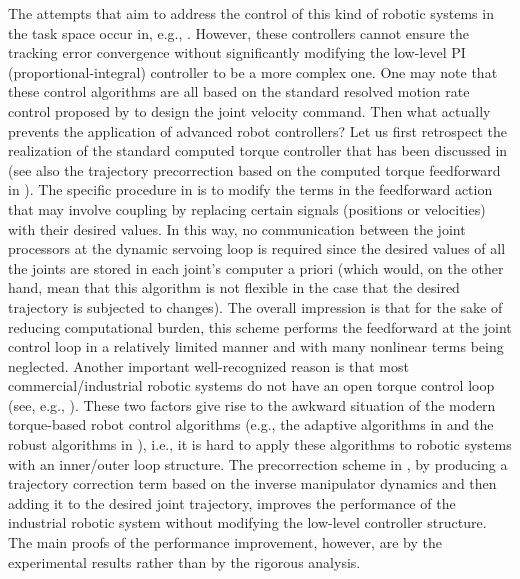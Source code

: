 \documentclass[9pt,technote]{IEEEtran}
\begin{document}
The attempts that aim to address the control of this kind of robotic systems in the task space occur in, e.g., \cite{Aicardi1995_ICRA,Roy2002_TRA,Kelly2005_AUT,Camarillo2008_Robotica}. However, these controllers cannot ensure the tracking error convergence without significantly modifying the low-level PI (proportional-integral) controller to be a more complex one. One may note that these control algorithms are all based on the standard resolved motion rate control proposed by \cite{Whitney1969_Resolved} to design the joint velocity command. Then what actually prevents the application of advanced robot controllers? Let us first retrospect the realization of the standard computed torque controller that has been discussed in \cite[p.~209, p.~210]{Spong1989_Book} (see also the trajectory precorrection based on the computed torque feedforward in \cite{Grotjahn2002_IJRR}). The specific procedure in \cite{Spong1989_Book}  is to modify the terms in the feedforward action that may involve coupling by replacing certain signals (positions or velocities) with their desired values. In this way, no communication between the joint processors at the dynamic servoing loop is required since the desired values of all the joints are stored in each joint's computer a priori (which would, on the other hand, mean that this algorithm is not flexible in the case that the desired trajectory is subjected to changes). The overall impression is that for the sake of reducing computational burden, this scheme performs the feedforward at the joint control loop in a relatively limited manner and with many nonlinear terms being neglected. Another important well-recognized reason is that most commercial/industrial robotic systems do not have an open torque control loop (see, e.g., \cite{Sanfilippo2015_RAM}). These two factors give rise to the awkward situation of the modern torque-based robot control algorithms (e.g., the adaptive algorithms in \cite{Slotine1987_IJRR,Spong1989_SCL,Cheah2006_TAC,Liu2006_TRO,Dixon2007_TAC,Wang2015_AUT,Wang2012a_MECH} and the robust algorithms in \cite{Spong1992_TAC,Yao1996_ASME}), i.e., it is hard to apply these algorithms to robotic systems with an inner/outer loop structure. The precorrection scheme in \cite{Grotjahn2002_IJRR}, by producing a trajectory correction term based on the
inverse manipulator dynamics and then adding it to the desired joint trajectory, improves the performance of the industrial robotic system without modifying the low-level controller structure. The main proofs of the performance improvement, however, are by the experimental results rather than by the rigorous analysis.
\end{document}

